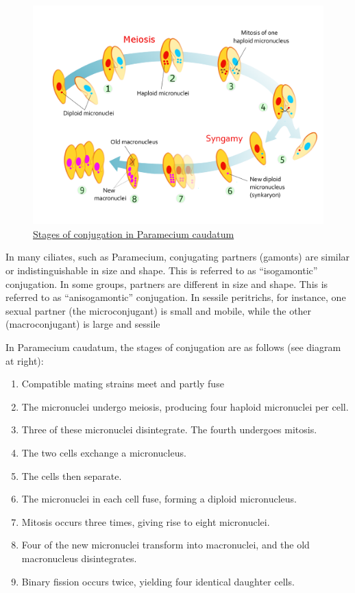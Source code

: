 \begin{figure}

{\centering \includegraphics[width=0.7\linewidth]{./figures/protista/Stages_of_ciliate_conjugation} 

}

\caption{\href{https://commons.wikimedia.org/wiki/File:Stages_of_ciliate_conjugation.png}{Stages of conjugation in Paramecium caudatum}}\label{fig:cilconjugation}
\end{figure}

In many ciliates, such as Paramecium, conjugating partners (gamonts) are similar or indistinguishable in size and shape. This is referred to as ``isogamontic'' conjugation. In some groups, partners are different in size and shape. This is referred to as ``anisogamontic'' conjugation. In sessile peritrichs, for instance, one sexual partner (the microconjugant) is small and mobile, while the other (macroconjugant) is large and sessile

In Paramecium caudatum, the stages of conjugation are as follows (see diagram at right):

\begin{enumerate}
\def\labelenumi{\arabic{enumi}.}
\tightlist
\item
  Compatible mating strains meet and partly fuse
\item
  The micronuclei undergo meiosis, producing four haploid micronuclei per cell.
\item
  Three of these micronuclei disintegrate. The fourth undergoes mitosis.
\item
  The two cells exchange a micronucleus.
\item
  The cells then separate.
\item
  The micronuclei in each cell fuse, forming a diploid micronucleus.
\item
  Mitosis occurs three times, giving rise to eight micronuclei.
\item
  Four of the new micronuclei transform into macronuclei, and the old macronucleus disintegrates.
\item
  Binary fission occurs twice, yielding four identical daughter cells.
\end{enumerate}

